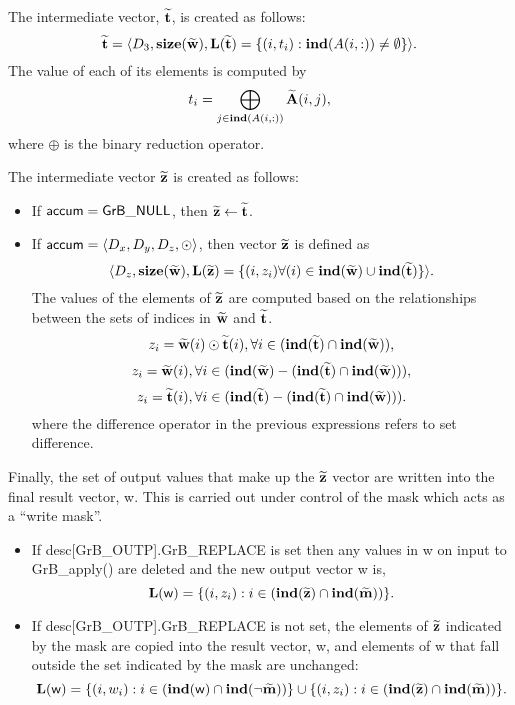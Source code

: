 The intermediate vector, ${\bf \widetilde{t}}$, is created as follows:
\[ 
{\bf \widetilde{t}} = \langle
D_3, \bold{size}({\bf \widetilde{w}}),
\bold{L}({\bf \widetilde{t}}) =
\{(i,t_i) : \bold{ind}(A(i,:)) \neq \emptyset   \} \rangle. 
\]
The value of each of its elements is computed by
\[
	t_i = \bigoplus_{j \in \bold{ind}(A(i,:))} {\bf \widetilde{A}}(i,j), 
\]
where $\oplus$ is the binary reduction operator.

The intermediate vector ${\bf \widetilde{z}}$ is created as follows:
\begin{itemize}
    \item If ${\sf accum} = {\sf GrB\_NULL}$, then ${\bf \widetilde{z}} \leftarrow {\bf \widetilde{t}}$.

    \item If ${\sf accum} = \langle D_x, D_y, D_z, \odot \rangle$, then vector ${\bf \widetilde{z}}$ is defined as 
        \[ \langle D_z, \bold{size}({\bf \widetilde{w}}), \bold{L}({\bf \widetilde{z}})
		= \{(i,z_{i})  \forall (i) \in \bold{ind}({\bf \widetilde{w}}) \cup 
        \bold{ind}({\bf \widetilde{t}}) \} \rangle.\]
    The values of the elements of ${\bf \widetilde{z}}$ are computed based on the relationships between the sets of indices in ${\bf \widetilde{w}}$ and ${\bf \widetilde{t}}$.
\[
z_{i} = {\bf \widetilde{w}}(i) \odot {\bf \widetilde{t}}(i), \forall i \in  (\bold{ind}({\bf \widetilde{t}}) \cap \bold{ind}({\bf \widetilde{w}})),
\]
\[
z_{i} = {\bf \widetilde{w}}(i), \forall  i \in  (\bold{ind}({\bf \widetilde{w}}) - (\bold{ind}({\bf \widetilde{t}}) \cap \bold{ind}({\bf \widetilde{w}}))),
\]
\[
z_{i} = {\bf \widetilde{t}}(i), \forall  i \in  (\bold{ind}({\bf \widetilde{t}}) - (\bold{ind}({\bf \widetilde{t}}) \cap \bold{ind}({\bf \widetilde{w}}))).
\]
where the difference operator in the previous expressions refers to set difference.
\end{itemize}

Finally, the set of output values that make up the ${\bf \widetilde{z}}$ 
vector are written into the final result vector, {\sf w}. 
This is carried out under control of the mask which acts as a ``write mask''.
\begin{itemize}
\item If {\sf desc[GrB\_OUTP].GrB\_REPLACE} is set then any values in {\sf w} 
on input to {\sf GrB\_apply()} are deleted and the new output vector {\sf w} is,
\[ \bold{L}({\sf w}) = \{(i,z_{i}) : i \in (\bold{ind}({\bf \widetilde{z}}) 
\cap \bold{ind}({\bf \widetilde{m}})) \}. \]

\item If {\sf desc[GrB\_OUTP].GrB\_REPLACE} is not set, the elements of 
${\bf \widetilde{z}}$ indicated by 
the mask are copied into the result vector, {\sf w}, and elements of 
{\sf w} that fall outside the set indicated by the mask are unchanged:
\[ \bold{L}({\sf w}) = \{(i,w_{i}) : i \in (\bold{ind}({\sf w}) 
\cap \bold{ind}(\neg {\bf \widetilde{m}})) \} \cup \{(i,z_{i}) : i \in 
(\bold{ind}({\bf \widetilde{z}}) \cap \bold{ind}({\bf \widetilde{m}})) \}. \]
\end{itemize}

